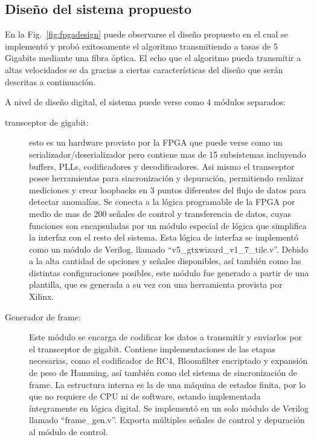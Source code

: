 \subsection{Diseño del sistema propuesto}
En la Fig.~\ref{fig:fpgadesign} puede observarse el diseño propuesto en el cual se implementó y probó exitosamente el algoritmo transmitiendo a tasas de 5 Gigabits mediante una fibra óptica.
El echo que el algoritmo pueda transmitir a altas velocidades se da gracias a ciertas características del diseño que serán descritas a continuación.

A nivel de diseño digital, el sistema puede verse como 4 módulos separados:

\begin{description}
 \item[transceptor de gigabit:] esto es un hardware provisto por la FPGA que puede verse como un serializador/deserializador pero contiene mas de 15 subsistemas incluyendo buffers, PLLs, codificadores y decodificadores. Asi mismo el transceptor posee herramientas para sincronización y depuración, permitiendo realizar mediciones y crear loopbacks en 3 puntos diferentes del flujo de datos para detectar anomalías. Se conecta a la lógica programable de la FPGA por medio de mas de 200 señales de control y transferencia de datos, cuyas funciones son encapsuladas por un módulo especial de lógica que simplifica la interfaz con el resto del sistema. Esta lógica de interfaz se implementó como un módulo de Verilog, llamado ``v5\_gtxwizard\_v1\_7\_tile.v''. Debido a la alta cantidad de opciones y señales disponibles, así también como las distintas configuraciones posibles, este módulo fue generado a partir de una plantilla, que es generada a su vez con una herramienta provista por Xilinx.

 \item[Generador de frame:] Este módulo se encarga de codificar los datos a transmitir y enviarlos por el transceptor de gigabit. Contiene implementaciones de las etapas necesarias, como el codificador de RC4, Bloomfilter encriptado y expansión de peso de Hamming, así también como del sistema de sincronización de frame. La estructura interna es la de una máquina de estados finita, por lo que no requiere de CPU ni de software, estando implementada íntegramente en lógica digital. Se implementó en un solo módulo de Verilog llamado ``frame\_gen.v''. Exporta múltiples señales de control y depuración al módulo de control.
 

\end{description}
